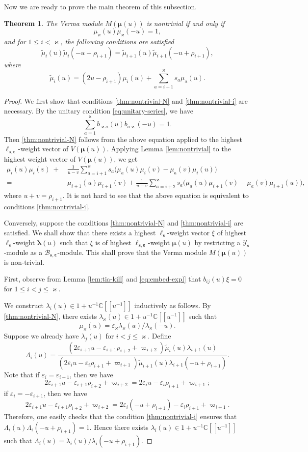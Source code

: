 \documentclass[11pt,reqno]{amsart}
\numberwithin{equation}{section}
\newtheorem{thm}{Theorem}[section]
\theoremstyle{definition}
\theoremstyle{remark}
\newcommand{\beq}{\begin{equation}}
\newcommand{\eeq}{\end{equation}}
\newcommand{\C}{\mathbb{C}}
\newcommand{\tl}{\tilde}
\newcommand{\lle}{\leqslant}
\newcommand{\la}{\lambda}
\newcommand{\La}{\Lambda}
\newcommand{\bla}{\bm\lambda}
\newcommand{\YMN}{{\mathscr{Y}_{\bm s}}}
\newcommand{\BMN}{{\mathscr{B}_{\bm s,\bm \ve}}}
\newcommand{\ka}{\varkappa}
\newcommand{\ve}{\varepsilon}
\newcommand{\s}{{\bm s}}
\begin{document}
Now we are ready to prove the main theorem of this subsection.
\begin{thm}\label{thmnontrivial}
The Verma module $M(\bm\mu(u))$ is nontrivial if and only if
\beq\label{thm:nontrivial-N}
\mu_\ka(u)\mu_{\ka}(-u)=1,
\eeq
and for $1\lle i < \ka$, the following conditions are satisfied
\beq\label{thm:nontrivial-i}
\tilde \mu_i(u)\tilde\mu_i(-u+\rho_{i+1})=\tilde \mu_{i+1}(u)\tilde\mu_{i+1}(-u+\rho_{i+1}),
\eeq
where
\beq\label{eq:mu-tilde}
\tilde \mu_i(u)=(2u-\rho_{i+1})\mu_i(u)+\sum_{a=i+1}^\ka s_a\mu_a(u).
\eeq
\end{thm}
\begin{proof}
We first show that conditions \eqref{thm:nontrivial-N} and \eqref{thm:nontrivial-i} are necessary. By the unitary condition \eqref{eq:unitary-series}, we have
\[
\sum_{a=1}^\ka b_{\ka a}(u)b_{a\ka}(-u)=1.
\]
Then \eqref{thm:nontrivial-N} follows from the above equation applied to the highest $\ell_{\s,\bm\ve}$-weight vector of $V(\bm\mu(u))$. Applying Lemma \ref{lem:nontrivial} to the highest weight vector of $V(\bm\mu(u))$, we get
\begin{align*}
\mu_i(u)\mu_i(v)\ +&\ \frac{1}{u-v}\sum_{a=i+1}^\ka s_a\big(\mu_a(u)\mu_i(v)-\mu_a(v)\mu_i(u)\big)\\
= &\
\mu_{i+1}(u)\mu_{i+1}(v)+\frac{1}{u-v}\sum_{a=i+2}^\ka s_a\big(\mu_{a}(u)\mu_{i+1}(v)-\mu_{a}(v)\mu_{i+1}(u)\big),
\end{align*}
where $u+v=\rho_{i+1}$. It is not hard to see that the above equation is equivalent to conditions \eqref{thm:nontrivial-i}.

Conversely, suppose the conditions \eqref{thm:nontrivial-N} and \eqref{thm:nontrivial-i} are satisfied. We shall show that there exists a highest $\ell_\s$-weight vector $\xi$ of highest $\ell_\s$-weight $\bla(u)$ such that $\xi$ is of highest $\ell_{\s,\bm\ve}$-weight $\bm\mu(u)$ by restricting a $\YMN$-module as a $\BMN$-module. This shall prove that the Verma module $M(\bm\mu(u))$ is non-trivial.

First, observe from Lemma \ref{lem:tia-kill} and \eqref{eq:embed-expl} that $b_{ij}(u)\xi =0$ for $1\lle i<j\lle \ka$.

We construct $\la_i(u)\in 1+u^{-1}\C[[u^{-1}]]$ inductively as follows. By \eqref{thm:nontrivial-N}, there exists $\la_\ka(u)\in 1+u^{-1}\C[[u^{-1}]]$ such that
$$
\mu_\ka(u)=\ve_\ka \la_\ka(u)/\la_\ka(-u).
$$
Suppose we already have $\la_j(u)$ for $i<j\lle \ka$. Define
\[
\La_i(u)=\frac{(2\ve_{i+1}u-\ve_{i+1}\rho_{i+2}+\varpi_{i+2})\tl \mu_i(u)\la_{i+1}(u)}{(2\ve_{i}u-\ve_{i}\rho_{i+1}+\varpi_{i+1})\tl \mu_{i+1}(u)\la_{i+1}(-u+\rho_{i+1})}.
\]
Note that if $\ve_i=\ve_{i+1}$, then we have
\beq\label{eq:good1}
2\ve_{i+1}u-\ve_{i+1}\rho_{i+2}+\varpi_{i+2}=2\ve_{i}u-\ve_{i}\rho_{i+1}+\varpi_{i+1};
\eeq
if $\ve_i=-\ve_{i+1}$, then we have
\beq\label{eq:good2}
2\ve_{i+1}u-\ve_{i+1}\rho_{i+2}+\varpi_{i+2}=2\ve_{i}(-u+\rho_{i+1})-\ve_{i}\rho_{i+1}+\varpi_{i+1}.
\eeq
Therefore, one easily checks that the condition \eqref{thm:nontrivial-i}
ensures that $\La_i(u)\La_{i}(-u+\rho_{i+1})=1$. Hence there exists $\la_i(u)\in 1+u^{-1}\C[[u^{-1}]]$ such that $\La_i(u)=\la_i(u)/\la_i(-u+\rho_{i+1})$.


\end{proof}
\end{document}
